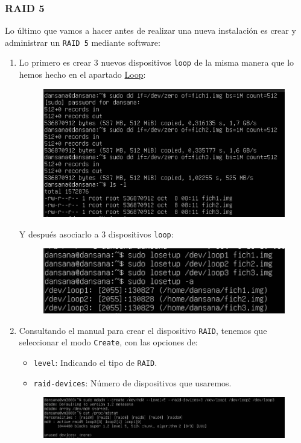 \documentclass[10pt]{article}
\begin{document}
	\subsubsection{RAID 5}
	Lo último que vamos a hacer antes de realizar una nueva instalación es crear y administrar un \verb|RAID 5| mediante software:
	\begin{enumerate}
		\item Lo primero es crear 3 nuevos dispositivos \verb|loop| de la misma manera que lo hemos hecho en el apartado \hyperref[sec:loop]{Loop}:
		\begin{figure}[H]
			\setlength{\abovecaptionskip}{0cm}
			\setlength{\belowcaptionskip}{0cm}
			\centering
			\includegraphics[width=0.5\linewidth]{Recursos/fichRAID.png}
		\end{figure}
		Y después asociarlo a 3 dispositivos \verb|loop|:
		\begin{figure}[H]
			\setlength{\abovecaptionskip}{0cm}
			\setlength{\belowcaptionskip}{0cm}
			\centering
			\includegraphics[width=0.5\linewidth]{Recursos/loopRAID.png}
		\end{figure}
		\item Consultando el manual para crear el dispositivo \verb|RAID|, tenemos que seleccionar el modo \verb|Create|, con las opciones de:
		\begin{itemize}
			\item \verb|level|: Indicando el tipo de \verb|RAID|.
			\item \verb|raid-devices|: Número de dispositivos que usaremos.
		\end{itemize}
		\begin{figure}[H]
			\setlength{\abovecaptionskip}{0cm}
			\setlength{\belowcaptionskip}{0cm}
			\centering
			\includegraphics[width=0.6\linewidth]{Recursos/createRAID.png}

\end{figure}
\end{enumerate}
\end{document}
